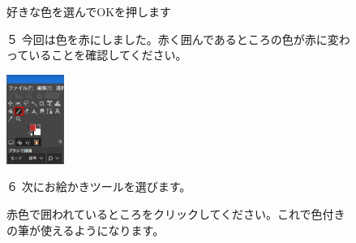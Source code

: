 \documentclass[a4paper,12pt]{jarticle}
\begin{document}
\begin{figure}[ht]
\begin{minipage}{\textwidth}
\begin{minipage}{8.984cm}
      好きな色を選んでOKを押します


      \bigskip
      \begin{minipage}{5.984cm}
        ５
        今回は色を赤にしました。赤く囲んであるところの色が赤に変わっていることを確認してください。


      \end{minipage}
    \end{minipage}
  \end{minipage}

  \includegraphics[width=1.866cm]{textbook-img127.png}
  \begin{minipage}[b]{6.663cm}
    ６ 次にお絵かきツールを選びます。

    赤色で囲われているところをクリックしてください。これで色付きの筆が使えるようになります。


    \bigskip

  \end{minipage}
\end{figure}
\clearpage
\end{document}
